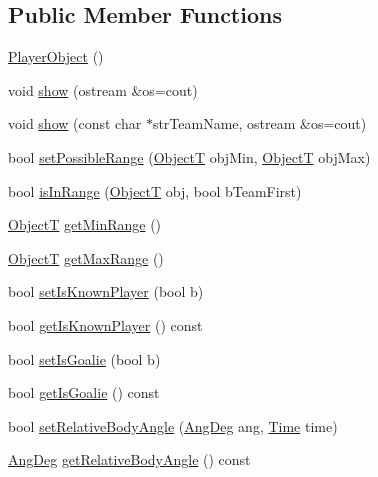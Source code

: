 \subsection*{Public Member Functions}
\begin{DoxyCompactItemize}
\item 
\hyperlink{classPlayerObject_a0de74cb0566e6c5dc782b78d5f32501e}{Player\+Object} ()
\item 
void \hyperlink{classPlayerObject_a01d587f88139dddf2ca1b39a65523dd6}{show} (ostream \&os=cout)
\item 
void \hyperlink{classPlayerObject_a4234130be56d2e3ff23145e142c6c181}{show} (const char $\ast$str\+Team\+Name, ostream \&os=cout)
\item 
bool \hyperlink{classPlayerObject_a5947796f3dc132c3b407854be2036b8a}{set\+Possible\+Range} (\hyperlink{SoccerTypes_8h_ad4b701fa66e7d26c054ed15b7820c77c}{ObjectT} obj\+Min, \hyperlink{SoccerTypes_8h_ad4b701fa66e7d26c054ed15b7820c77c}{ObjectT} obj\+Max)
\item 
bool \hyperlink{classPlayerObject_a77e552342790af61652521545711f557}{is\+In\+Range} (\hyperlink{SoccerTypes_8h_ad4b701fa66e7d26c054ed15b7820c77c}{ObjectT} obj, bool b\+Team\+First)
\item 
\hyperlink{SoccerTypes_8h_ad4b701fa66e7d26c054ed15b7820c77c}{ObjectT} \hyperlink{classPlayerObject_abe5b800c89fb628ce146ec16e62c6311}{get\+Min\+Range} ()
\item 
\hyperlink{SoccerTypes_8h_ad4b701fa66e7d26c054ed15b7820c77c}{ObjectT} \hyperlink{classPlayerObject_a9eb9334ac8da63977cd2b43cd3a40631}{get\+Max\+Range} ()
\item 
bool \hyperlink{classPlayerObject_a90b5b23a4994d3d06d3302272f19aaac}{set\+Is\+Known\+Player} (bool b)
\item 
bool \hyperlink{classPlayerObject_a6565b68bec196218e4a151e6c8146b76}{get\+Is\+Known\+Player} () const 
\item 
bool \hyperlink{classPlayerObject_a6ae91cbdd7c298c2248701ac8977874f}{set\+Is\+Goalie} (bool b)
\item 
bool \hyperlink{classPlayerObject_a5aac2afb86495626e1c2dac2de9951a5}{get\+Is\+Goalie} () const 
\item 
bool \hyperlink{classPlayerObject_aefec5e6db9cde23f9db19c71b8c2e8f8}{set\+Relative\+Body\+Angle} (\hyperlink{Geometry_8h_a6bfe02ae9bb185092902092561ab2865}{Ang\+Deg} ang, \hyperlink{classTime}{Time} time)
\item 
\hyperlink{Geometry_8h_a6bfe02ae9bb185092902092561ab2865}{Ang\+Deg} \hyperlink{classPlayerObject_a951e253e5bfd263c7b8ad0b5f134e5a1}{get\+Relative\+Body\+Angle} () const 

\end{DoxyCompactItemize}
